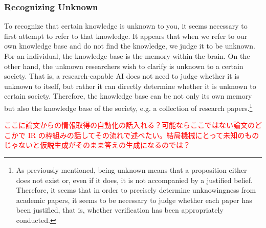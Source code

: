 \subsubsection{Recognizing Unknown}
To recognize that certain knowledge is unknown to you, it seems necessary to first attempt to refer to that knowledge. It appears that when we refer to our own knowledge base and do not find the knowledge, we judge it to be unknown. For an individual, the knowledge base is the memory within the brain. On the other hand, the unknown researchers wish to clarify is unknown to a certain society. That is, a research-capable AI does not need to judge whether it is unknown to itself, but rather it can directly determine whether it is unknown to certain society. Therefore, the knowledge base can be not only its own memory but also the knowledge base of the society, e.g. a collection of research papers.\footnote{
As previously mentioned, being unknown means that a proposition either does not exist or, even if it does, it is not accompanied by a justified belief. Therefore, it seems that in order to precisely determine unknowingness from academic papers, it seems to be necessary to judge whether each paper has been justified, that is, whether verification has been appropriately conducted. 
}

\textcolor{red}{ここに論文からの情報取得の自動化の話入れる？可能ならここではない論文のどこかで IR の枠組みの話してその流れで述べたい。結局機械にとって未知のものじゃないと仮説生成がそのまま答えの生成になるのでは？}



